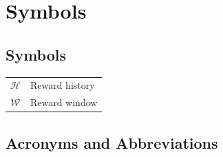 \chapter*{Symbols}\label{sec:symbols}

\section*{Symbols}
\renewcommand{\arraystretch}{1.3}
\setlength{\oldtabcolsep}{\tabcolsep}\setlength\tabcolsep{12pt}

\begin{tabularx}{\linewidth}{@{}ll@{}}
  $\mathcal{H}$ & Reward history \\
  $\mathcal{W}$ & Reward window  \\
\end{tabularx}

\renewcommand{\arraystretch}{1}
\setlength\tabcolsep{\oldtabcolsep}








\section*{Acronyms and Abbreviations}

\renewcommand{\arraystretch}{1.3}
\setlength{\oldtabcolsep}{\tabcolsep}\setlength\tabcolsep{12pt}

